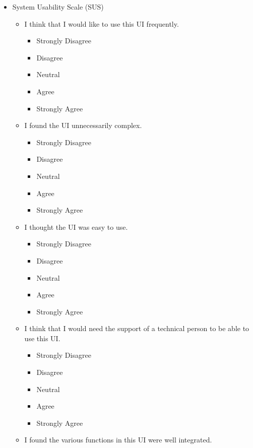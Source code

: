 \documentclass[doublespace,draft,nopageskip]{VTthesis} %
\begin{document}
\begin{itemize}
    \item System Usability Scale (SUS)
    \begin{itemize}
        \item I think that I would like to use this UI frequently.
            \begin{itemize}
                \item Strongly Disagree
                \item Disagree
                \item Neutral
                \item Agree
                \item Strongly Agree
            \end{itemize}
	\item I found the UI unnecessarily complex.
            \begin{itemize}
                \item Strongly Disagree
                \item Disagree
                \item Neutral
                \item Agree
                \item Strongly Agree
            \end{itemize}
	\item I thought the UI was easy to use.
            \begin{itemize}
                \item Strongly Disagree
                \item Disagree
                \item Neutral
                \item Agree
                \item Strongly Agree
            \end{itemize}
        \item I think that I would need the support of a technical person to be able to use this UI.
            \begin{itemize}
                \item Strongly Disagree
                \item Disagree
                \item Neutral
                \item Agree
                \item Strongly Agree
            \end{itemize}
        \item I found the various functions in this UI were well integrated.

\end{itemize}
\end{itemize}
\end{document}

